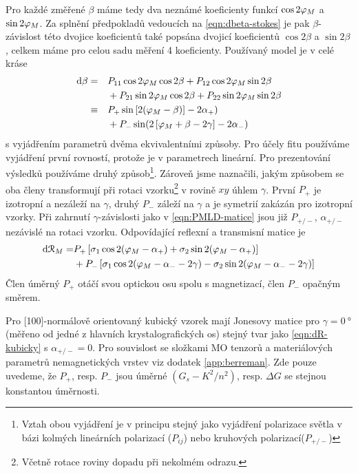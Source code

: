 Pro každé změřené $\beta$ máme tedy dva neznámé koeficienty funkcí $\cos2\varphi_M$ a $\sin2\varphi_M$.
Za splnění předpokladů vedoucích na \eqref{eqn:dbeta-stokes} je pak $\beta$-závislost této dvojice koeficientů také popsána dvojicí koeficientů $\cos2\beta$ a $\sin2\beta$, celkem máme pro celou sadu měření 4 koeficienty.
Používaný model je v celé kráse
\begin{alignat}{2}
    \label{eqn:PMLD-matice}
    \textrm{d}\beta &= && P_{11} \cos2\varphi_M\cos2\beta + P_{12}\cos2\varphi_M\sin2\beta \\
                    & && + P_{21}\sin2\varphi_M\cos2\beta + P_{22}\sin2\varphi_M\sin2\beta \\
                    &\equiv & & P_+ \sin\left[2(\varphi_M - \beta)\right] - 2\alpha_+) \\
                    &  & & + P_- \sin(2\left[\varphi_M + \beta - 2\gamma\right] - 2\alpha_-)
\end{alignat}
s vyjádřením parametrů dvěma ekvivalentními způsoby.
Pro účely fitu používáme vyjádření první rovností, protože je v parametrech lineární.
Pro prezentování výsledků používáme druhý způsob\footnote{Vztah obou vyjádření je v principu stejný jako vyjádření polarizace světla v bázi kolmých lineárních polarizací ($P_{ij}$) nebo kruhových polarizací($P_{+/-}$)}.
Zároveň jsme naznačili, jakým způsobem se oba členy transformují při rotaci vzorku\footnote{Včetně rotace roviny dopadu při nekolmém odrazu.} v rovině $xy$ úhlem $\gamma$.
První $P_+$ je izotropní a nezáleží na $\gamma$, druhý $P_-$ záleží na $\gamma$ a je symetrií zakázán pro izotropní vzorky.
Při zahrnutí $\gamma$-závislosti jako v \eqref{eqn:PMLD-matice} jsou již $P_{+/-}$, $\alpha_{+/-}$ nezávislé na rotaci vzorku.
Odpovídající reflexní a transmisní matice je
\begin{align}
    \label{eqn:dR-kubicky}
    \textrm{d}\mathcal{R}_M = &P_+ \left[\sigma_1\cos2(\varphi_M-\alpha_+) + \sigma_2 \sin2(\varphi_M-\alpha_+)\right] \\ 
                              & + P_- \left[\sigma_1\cos2(\varphi_M-\alpha_- - 2\gamma) - \sigma_2 \sin2(\varphi_M-\alpha_--2\gamma) \right]
\end{align}
Člen úměrný $P_+$ otáčí svou optickou osu spolu s magnetizací, člen $P_-$ opačným směrem.

Pro [100]-normálově orientovaný kubický vzorek mají Jonesovy matice pro $\gamma=\SI{0}{\degree}$ (měřeno od jedné z hlavních krystalografických os) stejný tvar jako \eqref{eqn:dR-kubicky} s $\alpha_{+/-}=0$.
Pro souvislost se složkami MO tenzorů a materiálových parametrů nemagnetických vrstev viz dodatek \ref{app:berreman}.
Zde pouze uvedeme, že $P_+$, resp. $P_-$ jsou úměrné $(G_s-K^2/n^2)$, resp. $\Delta G$ se stejnou konstantou úměrnosti.

